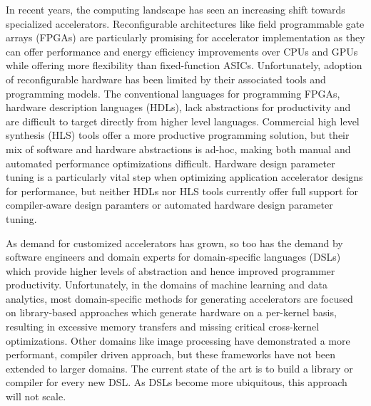 In recent years, the computing landscape has seen an increasing shift towards
specialized accelerators. Reconfigurable architectures like field programmable
gate arrays (FPGAs) are particularly promising for accelerator implementation
as they can offer performance and energy efficiency improvements over CPUs
and GPUs while offering more flexibility than fixed-function ASICs.
Unfortunately, adoption of reconfigurable
hardware has been limited by their associated tools and programming models.
The conventional languages for programming FPGAs, hardware description languages (HDLs),
lack abstractions for productivity and are difficult to target directly from
higher level languages.
Commercial high level synthesis (HLS) tools
offer a more productive programming solution, but
their mix of software and hardware abstractions is ad-hoc, making both manual
and automated performance optimizations difficult.
Hardware design parameter tuning is a particularly
vital step when optimizing application accelerator designs for performance, but
neither HDLs nor HLS tools currently offer full support for compiler-aware
design paramters or automated hardware design parameter tuning.

As demand for customized accelerators has grown, so too has the
demand by software engineers and domain experts for domain-specific
languages (DSLs) which provide higher levels of abstraction and hence improved
programmer productivity.
Unfortunately, in the domains of machine learning and data analytics,
most domain-specific methods for generating accelerators are
focused on library-based approaches which generate
hardware on a per-kernel basis, resulting in excessive memory transfers and
missing critical cross-kernel optimizations. Other domains like
image processing have demonstrated a more performant,
compiler driven approach, but these frameworks have not been extended to larger
domains. The current state of the art is to build a library or compiler for every
new DSL. As DSLs become more ubiquitous, this approach will not scale.

